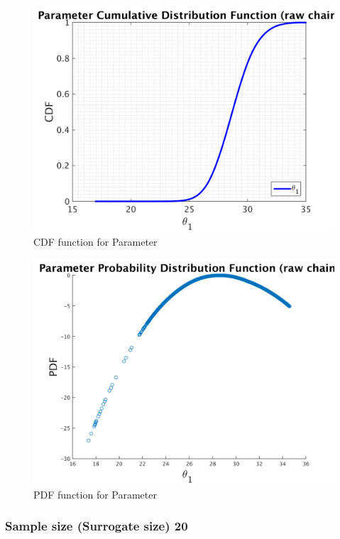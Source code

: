 \begin{figure}[H]
  
  \centering
   \includegraphics[scale=0.75]{53_results/output_10/simple_ip_cdf_raw}
   \caption{CDF function for Parameter }
\end{figure}



\begin{figure}[H]
  
  \centering
   \includegraphics[scale=0.75]{53_results/output_10/ip_logLike_unified}
   \caption{PDF function for Parameter }
\end{figure}



\subsubsection{Sample size (Surrogate size) 20 }

